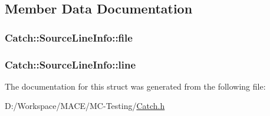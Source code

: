 \subsection{Member Data Documentation}
\subsubsection[{\texorpdfstring{file}{file}}]{ Catch\+::\+Source\+Line\+Info\+::file}\hypertarget{struct_catch_1_1_source_line_info_adf3ccf0c2bd326eb3466318af82a94dd}{}\label{struct_catch_1_1_source_line_info_adf3ccf0c2bd326eb3466318af82a94dd}
\subsubsection[{\texorpdfstring{line}{line}}]{ Catch\+::\+Source\+Line\+Info\+::line}\hypertarget{struct_catch_1_1_source_line_info_a841e5d696c7b9cde24e45e61dd979c77}{}\label{struct_catch_1_1_source_line_info_a841e5d696c7b9cde24e45e61dd979c77}


The documentation for this struct was generated from the following file\+:\begin{DoxyCompactItemize}
\item 
D\+:/\+Workspace/\+M\+A\+C\+E/\+M\+C-\/\+Testing/\hyperlink{_catch_8h}{Catch.\+h}\end{DoxyCompactItemize}
